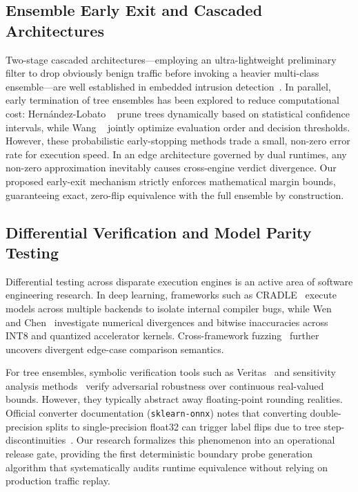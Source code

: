 \subsection{Ensemble Early Exit and Cascaded Architectures}
Two-stage cascaded architectures---employing an ultra-lightweight preliminary filter to drop obviously benign traffic before invoking a heavier multi-class ensemble---are well established in embedded intrusion detection~\cite{ferreira2026canbus}. In parallel, early termination of tree ensembles has been explored to reduce computational cost: Hern\'andez-Lobato \etal~\cite{hernandezlobato2009pruning} prune trees dynamically based on statistical confidence intervals, while Wang \etal~\cite{wang2018qwyc} jointly optimize evaluation order and decision thresholds. However, these probabilistic early-stopping methods trade a small, non-zero error rate for execution speed. In an edge architecture governed by dual runtimes, any non-zero approximation inevitably causes cross-engine verdict divergence. Our proposed early-exit mechanism strictly enforces mathematical margin bounds, guaranteeing exact, zero-flip equivalence with the full ensemble by construction.

\subsection{Differential Verification and Model Parity Testing}
Differential testing across disparate execution engines is an active area of software engineering research. In deep learning, frameworks such as CRADLE~\cite{pham2019cradle} execute models across multiple backends to isolate internal compiler bugs, while Wen \etal~\cite{wen2025mindthegap} and Chen~\cite{chen2026integeralibi} investigate numerical divergences and bitwise inaccuracies across INT8 and quantized accelerator kernels. Cross-framework fuzzing~\cite{duan2026xamt} further uncovers divergent edge-case comparison semantics. 

For tree ensembles, symbolic verification tools such as Veritas~\cite{devos2021veritas} and sensitivity analysis methods~\cite{naik2026sensitivity} verify adversarial robustness over continuous real-valued bounds. However, they typically abstract away floating-point rounding realities. Official converter documentation (\eg \texttt{sklearn-\allowbreak onnx}) notes that converting double-precision splits to single-precision float32 can trigger label flips due to tree step-\allowbreak discontinuities~\cite{sklearnonnx_float}. Our research formalizes this phenomenon into an operational release gate, providing the first deterministic boundary probe generation algorithm that systematically audits runtime equivalence without relying on production traffic replay.
